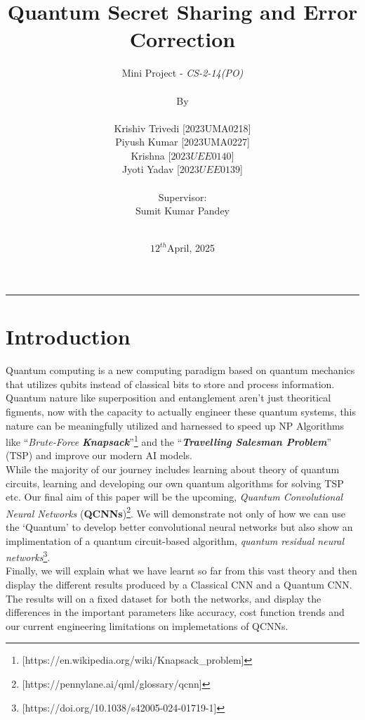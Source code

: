 \documentclass[a4paper]{article}
\title{Quantum Secret Sharing and Error Correction}
\author{
Mini Project - \emph{CS-2-14(PO)}  \\\\  \small{By} \\\\  Krishiv Trivedi\hspace{0.2cm} [2023UMA0218] \\ Piyush Kumar \hspace{0.193cm} [2023UMA0227] \\ Krishna \hspace{1.58cm}[$2023UEE0140$] \\ Jyoti Yadav \hspace{0.86cm}[$2023UEE0139$] \\\\ \small{Supervisor:} \\ Sumit Kumar Pandey \\ \hspace{0.94cm}\\
}
\date{$12^{th}$April, 2025}
\begin{document}
\maketitle
\hrule
\section*{Introduction}
Quantum computing is a new computing paradigm based on quantum
mechanics that utilizes qubits instead of classical bits to store and process
information. Quantum nature like superposition and entanglement aren't just theoritical figments, now with the capacity to actually engineer these quantum systems, this nature can be meaningfully utilized and harnessed to speed up NP Algorithms like ``\emph{Brute-Force} \emph{\textbf{Knapsack}}''\footnote{[https://en.wikipedia.org/wiki/Knapsack\_problem]} and the ``\emph{\textbf{Travelling Salesman Problem}}'' (TSP) and improve our modern AI models.\\

 While the majority of our journey includes learning about theory of quantum circuits, learning and developing our own quantum algorithms for solving TSP etc. Our final aim of this paper will be the upcoming, \emph{Quantum Convolutional Neural Networks} (\textbf{QCNNs})\footnote{[https://pennylane.ai/qml/glossary/qcnn]}. We will demonstrate not only of how we can use the `Quantum' to develop better convolutional neural networks but also show an implimentation of a quantum circuit-based algorithm, \emph{quantum residual neural networks}\footnote{[https://doi.org/10.1038/s42005-024-01719-1]}.\\

Finally, we will explain what we have learnt so far from this vast theory and then display the different results produced by a Classical CNN and a Quantum CNN. The results will on a fixed dataset for both the networks, and display the differences in the important parameters like accuracy, cost function trends and our current engineering limitations on implemetations of QCNNs.
\end{document}
